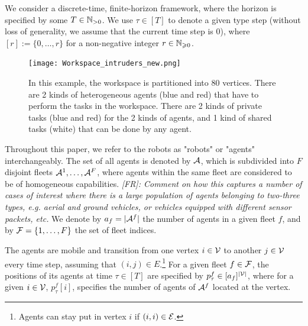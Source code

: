 \documentclass[conference]{IEEEtran}
\newcommand{\frline}[2]{{\color{blue}#1}{\em \color{blue}[FR]: #2}}
\newcommand{\frline}[2]{#1}
\begin{document}
We consider a discrete-time, finite-horizon framework, where the horizon is specified by some $T\in \mathbb{N}_{>0}$. We use $\tau\in [T]$ to denote a given type step (without loss of generality, we assume that the current time step is $0$), where $[r]:=\{0,\ldots,r\}$ for a non-negative integer $r\in \mathbb{N}_{\geqslant 0}$.


\begin{figure}[!ht]
    \centering
    \texttt{[image: Workspace\_intruders\_new.png]}
    \caption{In this example, the workspace is partitioned into $80$ vertices. There are 2 kinds of heterogeneous agents (blue and red) that have to perform the tasks in the workspace. There are 2 kinds of private tasks (blue and red) for the 2 kinds of agents, and 1 kind of shared tasks (white) that can be done by any agent.}
    \label{fig:workspace}
\end{figure}

Throughout this paper, we refer to the robots as "robots" or "agents" interchangeably. The set of all agents is denoted by $\mathcal{A}$, which is subdivided into $F$ disjoint fleets $\mathcal{A}^1,\ldots, \mathcal{A}^F$, where agents within the same fleet are considered to be of homogeneous capabilities.
\frline{}{Comment on how this captures a number of cases of interest where there is a large population of agents belonging to two-three types, e.g. aerial and ground vehicles, or vehicles equipped with different sensor packets, etc.}
We denote by $a_f=|\mathcal{A}^f|$ the number of agents in a given fleet $f$, and by $\mathcal{F}=\{1,\ldots,F\}$ the set of fleet indices. 

The agents are mobile and transition from one vertex $i\in \mathcal{V}$ to another $j\in \mathcal{V}$ every time step, assuming that $(i,j)\in E$.\footnote{Agents can stay put in vertex $i$ if $(i,i)\in \mathcal{E}$.}
For a given fleet $f\in \mathcal{F}$, the positions of its agents at time $\tau\in [T]$ are specified by $p^f_\tau\in [a_f]^{ |\mathcal{V}|}$, where for a given $i\in \mathcal{V}$, $p^f_\tau[i]$, specifies the number of agents of $\mathcal{A}^f$ located at the vertex. %
\end{document}
